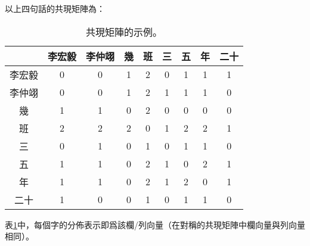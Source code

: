 以上四句話的共現矩陣為：
\begin{table}[ht]
    \center
    \begin{tabular}{|c|c|c|c|c|c|c|c|c|} \hline
           & 李宏毅 & 李仲翊 & 幾 & 班 & 三 & 五 & 年 & 二十  \\ \hline
     李宏毅 & 0 & 0 & 1 & 2 & 0 & 1 & 1 & 1 \\ \hline
     李仲翊 & 0 & 0 & 1 & 2 & 1 & 1 & 1 & 0 \\ \hline
        幾 & 1 & 1 & 0 & 2 & 0 & 0 & 0 & 0 \\ \hline
        班 & 2 & 2 & 2 & 0 & 1 & 2 & 2 & 1 \\ \hline
        三 & 0 & 1 & 0 & 1 & 0 & 1 & 1 & 0 \\ \hline
        五 & 1 & 1 & 0 & 2 & 1 & 0 & 2 & 1 \\ \hline
        年 & 1 & 1 & 0 & 2 & 1 & 2 & 0 & 1 \\ \hline
      二十 & 1 & 0 & 0 & 1 & 0 & 1 & 1 & 0 \\ \hline
    \end{tabular}
    \caption{共現矩陣的示例。}
    \label{tab:cooccur}
\end{table}

表\ref{tab:cooccur}中，每個字的分佈表示即爲該欄/列向量（在對稱的共現矩陣中欄向量與列向量相同）。
